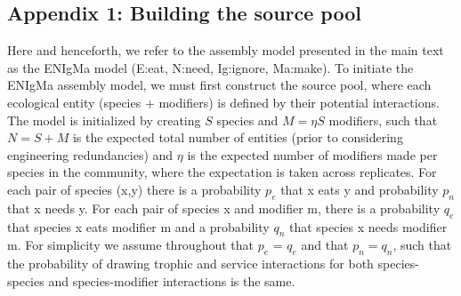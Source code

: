 \documentclass[twocolumn,preprintnumbers,amsmath,amssymb,superscriptaddress,linenumbers]{revtex4-1}
\newcommand{\rr}[1]{{\rm #1}}
\begin{document}
% 

\subsection*{Appendix 1: Building the source pool}
Here and henceforth, we refer to the assembly model presented in the main text as the ENIgMa model (E:eat, N:need, Ig:ignore, Ma:make).
To initiate the ENIgMa assembly model, we must first construct the source pool, where each ecological entity (species + modifiers) is defined by their potential interactions.
The model is initialized by creating $S$ species and $M = \eta S$ modifiers, such that $N=S+M$ is the expected total number of entities (prior to considering engineering redundancies) and $\eta$ is the expected number of modifiers made per species in the community, where the expectation is taken across replicates.
For each pair of species (x,y) there is a probability $p_e$ that x eats y and probability $p_n$ that x needs y.
For each pair of species x and modifier m, there is a probability $q_e$ that species x eats modifier m and a probability $q_n$ that species x needs modifier m.
For simplicity we assume throughout that $p_e$ = $q_e$ and that $p_n = q_n$, such that the probability of drawing trophic and service interactions for both species-species and species-modifier interactions is the same.
\end{document}
